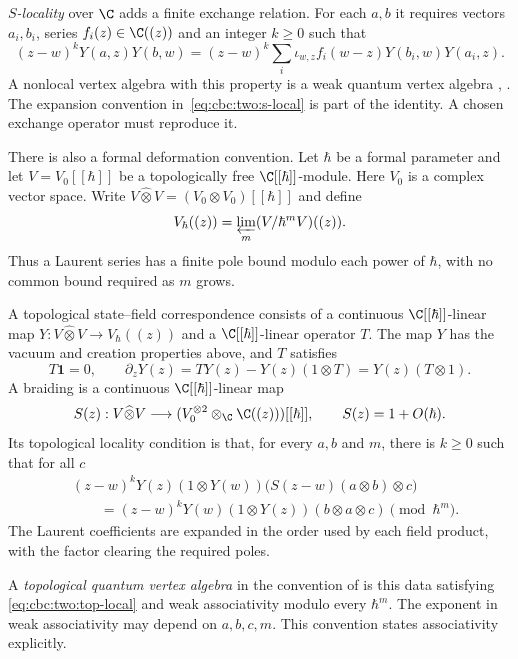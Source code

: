 \emph{$S$-locality} over $\C$ adds a finite exchange relation.
For each $a,b$ it requires vectors $a_i,b_i$, series
$f_i(z)\in\C((z))$ and an integer $k\geq0$ such that
\begin{equation}
 (z-w)^kY(a,z)Y(b,w)
 =(z-w)^k\sum_i\iota_{w,z}f_i(w-z)Y(b_i,w)Y(a_i,z).
 \label{eq:cbc:two:s-local}
\end{equation}
A nonlocal vertex algebra with this property is a weak quantum
vertex algebra \cite[Remark 5.6]{LiNonlocal}, \cite[\S3]{LiQVA}.
The expansion convention in~\eqref{eq:cbc:two:s-local} is part of
the identity. A chosen exchange operator must reproduce it.

There is also a formal deformation convention.
Let $\hbar$ be a formal parameter and let $V=V_0[[\hbar]]$ be
a topologically free $\C[[\hbar]]$-module.
Here $V_0$ is a complex vector space.
Write $V\widehat\otimes V=(V_0\otimes V_0)[[\hbar]]$ and define
\[
 V_\hbar((z))=\varprojlim_m(V/\hbar^mV)((z)).
\]
Thus a Laurent series has a finite pole bound modulo each power
of $\hbar$, with no common bound required as $m$ grows.

A topological state--field correspondence consists of a continuous
$\C[[\hbar]]$-linear map $Y:V\widehat\otimes V\to V_\hbar((z))$
and a $\C[[\hbar]]$-linear operator $T$.
The map $Y$ has the vacuum and creation properties above, and $T$ satisfies
\[
 T\mathbf1=0,\qquad
 \partial_zY(z)=TY(z)-Y(z)(1\otimes T)=Y(z)(T\otimes1).
\]
A braiding is a continuous $\C[[\hbar]]$-linear map
\[
 S(z):V\widehat\otimes V\longrightarrow
 (V_0^{\otimes2}\otimes_{\C}\C((z)))[[\hbar]],
 \qquad S(z)=1+O(\hbar).
\]
Its topological locality condition is that, for every $a,b$ and $m$,
there is $k\geq0$ such that for all $c$
\begin{equation}
 \begin{aligned}
 &(z-w)^kY(z)(1\otimes Y(w))
       \bigl(S(z-w)(a\otimes b)\otimes c\bigr)\\
 &\hspace{2em}=(z-w)^kY(w)(1\otimes Y(z))(b\otimes a\otimes c)
       \pmod{\hbar^m}.
 \end{aligned}
 \label{eq:cbc:two:top-local}
\end{equation}
The Laurent coefficients are expanded in the order used by each
field product, with the factor clearing the required poles.

A \emph{topological quantum vertex algebra} in the convention of
\cite[Definitions 3.5 and 3.12]{DSGKQVA} is this data satisfying
\eqref{eq:cbc:two:top-local} and weak associativity modulo every
$\hbar^m$. The exponent in weak associativity may depend on $a,b,c,m$.
This convention states associativity explicitly.

